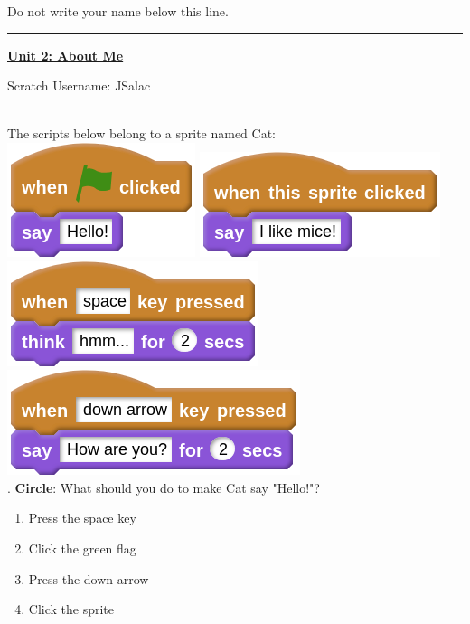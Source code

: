 \documentclass[letterpaper,12pt]{article}
\begin{document}
\noindent Do not write your name below this line. \\
\noindent \hrule
\begin{center}
{\Large \textbf{\underline{Unit 2: About Me}}}
\end{center}
Scratch Username: JSalac 
 
\noindent \dotfill \\

\noindent The scripts below belong to a sprite named Cat: \\
\includegraphics[scale=.4]{q1_script2} \hspace{1cm}
\includegraphics[scale=.4]{q1_script1} \hspace{1cm}
\includegraphics[scale=.4]{q1_script3} \hspace{1cm}
\includegraphics[scale=.4]{q1_script0} \hspace{1cm} \\


. \textbf{Circle}: What should you do to make Cat say "Hello!"?
\renewcommand{\theenumi}{\Alph{enumi}}
\begin{enumerate}
\item Press the space key
\item Click the green flag
\item Press the down arrow
\item Click the sprite
\end{enumerate}
\end{document}
